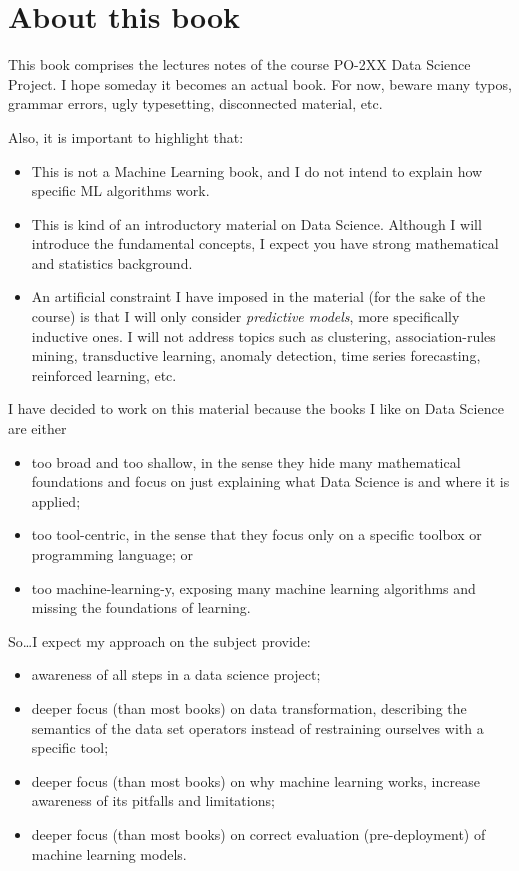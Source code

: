 \chapter*{About this book}

This book comprises the lectures notes of the course PO-2XX Data Science Project.
I hope someday it becomes an actual book. For now, beware many typos, grammar errors, ugly
typesetting, disconnected material, etc.

Also, it is important to highlight that:
\begin{itemize}
  \item This is not a Machine Learning book, and I do not intend to explain how specific
    ML algorithms work.
  \item This is kind of an introductory material on Data Science.  Although I will
    introduce the fundamental concepts, I expect you have strong mathematical and
    statistics background.
  \item An artificial constraint I have imposed in the material (for the sake of the
    course) is that I will only consider \emph{predictive models}, more specifically
    inductive ones. I will not address topics such as clustering, association-rules
    mining, transductive learning, anomaly detection, time series forecasting, reinforced
    learning, etc.
\end{itemize}

I have decided to work on this material because the books I like on Data Science are
either
\begin{itemize}
  \item too broad and too shallow, in the sense they hide many mathematical foundations
    and focus on just explaining what Data Science is and where it is applied;
  \item too tool-centric, in the sense that they focus only on a specific toolbox or
    programming language; or
  \item too machine-learning-y, exposing many machine learning algorithms and missing the
    foundations of learning.
\end{itemize}

So\dots I expect my approach on the subject provide:
\begin{itemize}
  \item awareness of all steps in a data science project;
  \item deeper focus (than most books) on data transformation, describing the semantics of the data set
    operators instead of restraining ourselves with a specific tool;
  \item deeper focus (than most books) on why machine learning works, increase awareness of its pitfalls and
    limitations;
  \item deeper focus (than most books) on correct evaluation (pre-deployment) of machine learning models.
\end{itemize}

